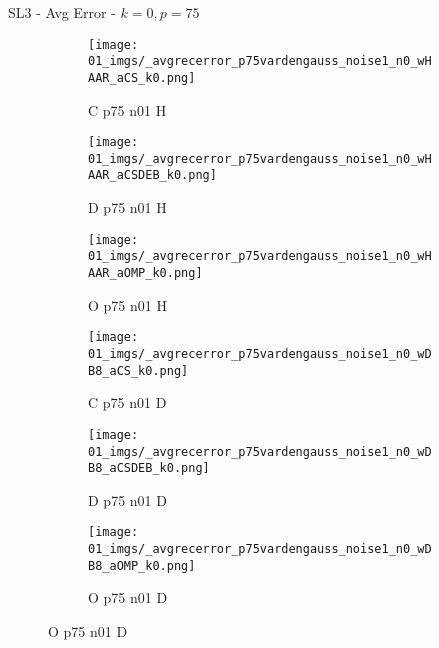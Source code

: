 \begin{frame}{SL3 - Avg Error - $k=0,p=75$}{}
\begin{figure}
\begin{subfigure}{0.13\textwidth}
\texttt{[image: 01\_imgs/\_avgrecerror\_p75vardengauss\_noise1\_n0\_wHAAR\_aCS\_k0.png]}
\caption*{\tiny C p75 n01 H}
\end{subfigure}
\begin{subfigure}{0.13\textwidth}
\texttt{[image: 01\_imgs/\_avgrecerror\_p75vardengauss\_noise1\_n0\_wHAAR\_aCSDEB\_k0.png]}
\caption*{\tiny D p75 n01 H}
\end{subfigure}
\begin{subfigure}{0.13\textwidth}
\texttt{[image: 01\_imgs/\_avgrecerror\_p75vardengauss\_noise1\_n0\_wHAAR\_aOMP\_k0.png]}
\caption*{\tiny O p75 n01 H}
\end{subfigure}
\begin{subfigure}{0.13\textwidth}
\texttt{[image: 01\_imgs/\_avgrecerror\_p75vardengauss\_noise1\_n0\_wDB8\_aCS\_k0.png]}
\caption*{\tiny C p75 n01 D}
\end{subfigure}
\begin{subfigure}{0.13\textwidth}
\texttt{[image: 01\_imgs/\_avgrecerror\_p75vardengauss\_noise1\_n0\_wDB8\_aCSDEB\_k0.png]}
\caption*{\tiny D p75 n01 D}
\end{subfigure}
\begin{subfigure}{0.13\textwidth}
\texttt{[image: 01\_imgs/\_avgrecerror\_p75vardengauss\_noise1\_n0\_wDB8\_aOMP\_k0.png]}
\caption*{\tiny O p75 n01 D}
\end{subfigure}

\vspace{5pt}


\end{figure}
\end{frame}
